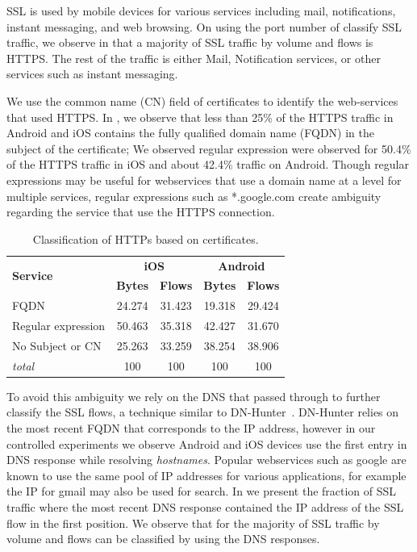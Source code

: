 SSL is used by mobile devices for various services including mail, notifications, instant messaging, and web browsing.
On using the port number of classify SSL traffic,  we observe in  that a majority of SSL traffic by volume and flows is HTTPS.
The rest of the traffic is either Mail, Notification services, or other services such as instant messaging.

We use the common name (CN) field of certificates to identify the web-services that used HTTPS.
In , we observe that less than 25\% of the HTTPS traffic in Android and iOS contains the fully qualified domain name (FQDN) in the subject of the certificate;
We observed regular expression were observed for 50.4\% of the HTTPS traffic in iOS and about 42.4\% traffic on Android. 
Though regular expressions may be useful for webservices that use a domain name at a level for multiple services, regular expressions such as *.google.com create ambiguity regarding the service that use the HTTPS connection. 


\begin{table}
\centering
\begin{small}
\begin{tabular}{|p{}|c|c|c|c|}
\hline
\multirow{2}{*}{\bf Service} & \multicolumn{2}{c|}{\bf iOS} &  \multicolumn{2}{c|}{\bf Android} \tabularnewline
\cline{2-5}
  & {\bf Bytes}  & {\bf Flows} & {\bf Bytes} & {\bf Flows} \tabularnewline
\hline
FQDN                   & 24.274 & 31.423  & 19.318 & 29.424 \tabularnewline
\hline
Regular expression     & 50.463 & 35.318  & 42.427 & 31.670 \tabularnewline
\hline
No Subject or CN       & 25.263 & 33.259  & 38.254 & 38.906 \tabularnewline
\hline
{\em total}            & 100 & 100 & 100 & 100 \tabularnewline
\hline
\end{tabular}
\end{small}
\caption{Classification of HTTPs based on certificates.}
\label{tab:classify-http-cert}
\end{table}


To avoid this ambiguity we rely on the DNS that passed through \platname to further classify the SSL flows, a technique similar to DN-Hunter~\cite{bermudez:dnhunter}.
DN-Hunter relies on the most recent FQDN that corresponds to the IP address, however in our controlled experiments we observe Android and iOS devices use the first entry in DNS response while resolving \emph{hostnames}.
Popular webservices such as google are known to use the same pool of IP addresses for various applications, for example the IP for gmail may also be used for search. 
In  we present the fraction of SSL traffic where the most recent DNS response contained the IP address of the SSL flow in the first position. 
We observe that for the majority of SSL traffic by volume and flows can be classified by using the DNS responses. 

